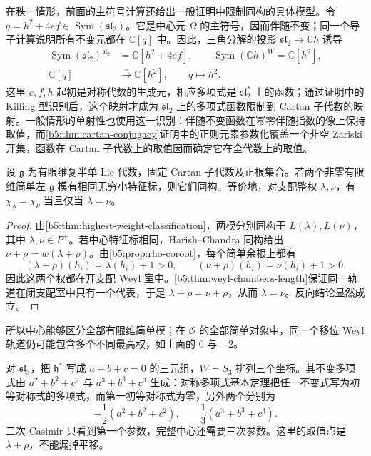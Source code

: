 在秩一情形，前面的主符号计算还给出一般证明中限制同构的具体模型。令 \(q=h^2+4ef\in\operatorname{Sym}(\mathfrak{sl}_2)\)。它是中心元 \(\Omega\) 的主符号，因而伴随不变；同一个导子计算说明所有不变元都在 \(\mathbb C[q]\) 中。因此，三角分解的投影 \(\mathfrak{sl}_2\to\mathbb Ch\) 诱导
\[
	\begin{aligned}
		\operatorname{Sym}(\mathfrak{sl}_2)^{\mathfrak{sl}_2} &=\mathbb C[h^2+4ef],\qquad \operatorname{Sym}(\mathbb Ch)^W=\mathbb C[h^2],\\
		\mathbb C[q]&\xrightarrow{\sim}\mathbb C[h^2], \qquad q\longmapsto h^2.
	\end{aligned}
\]
这里 \(e,f,h\) 起初是对称代数的生成元，相应多项式是 \(\mathfrak{sl}_2^*\) 上的函数；通过证明中的 Killing 型识别后，这个映射才成为 \(\mathfrak{sl}_2\) 上的多项式函数限制到 Cartan 子代数的映射。一般情形的单射性也使用这一识别：伴随不变函数在幂零伴随指数的像上保持取值，而\cref{b5:thm:cartan-conjugacy}证明中的正则元素参数化覆盖一个非空 Zariski 开集，函数在 Cartan 子代数上的取值因而确定它在全代数上的取值。

\begin{corollary}\label{b5:cor:finite-simple-central-character}
	设 \(\mathfrak g\) 为有限维复半单 Lie 代数，固定 Cartan 子代数及正根集合。若两个非零有限维简单左 \(\mathfrak g\) 模有相同无穷小特征标，则它们同构。等价地，对支配整权 \(\lambda,\nu\)，有 \(\chi_\lambda=\chi_\nu\) 当且仅当 \(\lambda=\nu\)。
\end{corollary}
\begin{proof}
	由\cref{b5:thm:highest-weight-classification}，两模分别同构于 \(L(\lambda),L(\nu)\)，其中 \(\lambda,\nu\in P^+\)。若中心特征标相同，Harish--Chandra 同构给出 \(\nu+\rho=w(\lambda+\rho)\)。由\cref{b5:prop:rho-coroot}，每个简单余根上都有
	\[
		(\lambda+\rho)(h_i)=\lambda(h_i)+1>0,\qquad (\nu+\rho)(h_i)=\nu(h_i)+1>0.
	\]
	因此这两个权都在开支配 Weyl 室中。\cref{b5:thm:weyl-chambers-length}保证同一轨道在闭支配室中只有一个代表，于是 \(\lambda+\rho=\nu+\rho\)，从而 \(\lambda=\nu\)。反向结论显然成立。
\end{proof}

所以中心能够区分全部有限维简单模；在 \(\mathcal O\) 的全部简单对象中，同一个移位 Weyl 轨道仍可能包含多个不同最高权，如上面的 \(0\) 与 \(-2\)。

\begin{example}\label{b5:exm:hc-sl3-orbit}
	对 \(\mathfrak{sl}_3\)，把 \(\mathfrak h^*\) 写成 \(a+b+c=0\) 的三元组，\(W=S_3\) 排列三个坐标。其不变多项式由 \(a^2+b^2+c^2\) 与 \(a^3+b^3+c^3\) 生成：对称多项式基本定理把任一不变式写为初等对称式的多项式，而第一初等对称式为零，另外两个分别为
	\[
		-\frac12(a^2+b^2+c^2),\qquad \frac13(a^3+b^3+c^3).
	\]
	二次 Casimir 只看到第一个参数，完整中心还需要三次参数。这里的取值点是 \(\lambda+\rho\)，不能漏掉平移。
\end{example}

